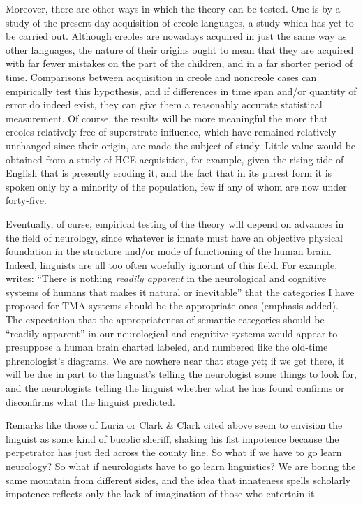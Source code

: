Moreover, there are other ways in which the theory can be tested. One is by a study of the present-day acquisition of creole languages, a study which has yet to be carried out. Although creoles are nowadays acquired in just the same way as other languages, the nature of their origins ought to mean that they are acquired with far fewer mistakes on the part of the children, and in a far shorter period of time. Comparisons between acquisition in creole and noncreole cases can empirically test this hypothesis, and if differences in time span and/or quantity of error do indeed exist, they can give them a reasonably accurate statistical measurement. Of course, the results will be more meaningful the more that creoles relatively free of superstrate influence, which have remained relatively unchanged since their origin, are made the subject of study. Little value would be obtained from a study of HCE acquisition, for example, given the rising tide of English that is presently eroding it, and the fact that in its purest form it is spoken only by a minority of the population, few if any of whom are now under forty-five.


Eventually, of curse, empirical testing of the theory will depend on advances in the field of neurology, since whatever is innate must have an objective physical foundation in the structure and/or mode of functioning of the human brain. Indeed, linguists are all too often woefully ignorant of this field. For example, \citet{Alleyne1979} writes: ``There is nothing \textit{readily apparent} in the neurological and cognitive systems of humans that makes it natural or inevitable'' that the categories I have proposed for TMA systems should be the appropriate ones (emphasis added). The expectation that the appropriateness of semantic categories should be ``readily apparent'' in our neurological and cognitive systems would appear to presuppose a human brain charted labeled, and numbered like the old-time phrenologist's diagrams. We are nowhere near that stage yet; if we get there, it will be due in part to the linguist's telling the neurologist some things to look for, and the neurologists telling the linguist whether what he has found confirms or disconfirms what the linguist predicted.

Remarks like those of Luria or Clark \& Clark cited above seem to envision the linguist as some kind of bucolic sheriff, shaking his fist impotence because the perpetrator has just fled across the county line. So what if we have to go learn neurology? So what if neurologists have to go learn linguistics? We are boring the same mountain from different sides, and the idea that innateness spells scholarly impotence reflects only the lack of imagination of those who entertain it.

